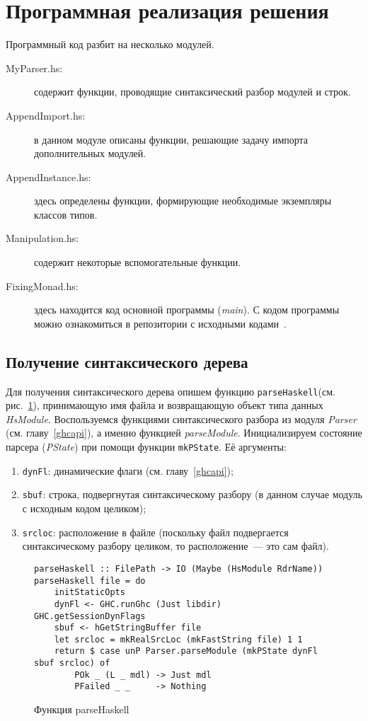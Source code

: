 \section{Программная реализация решения}
Программный код разбит на несколько модулей.
\begin{description}
    \item[MyParser.hs:] содержит функции, проводящие синтаксический разбор модулей и строк.
    \item[AppendImport.hs:] в данном модуле описаны функции, решающие задачу импорта дополнительных модулей.
    \item[AppendInstance.hs:] здесь определены функции, формирующие необходимые экземпляры классов типов.
    \item[Manipulation.hs:] содержит некоторые вспомогательные функции.
    \item[FixingMonad.hs:] здесь находится код основной программы (\textit{main}).
    С кодом программы можно ознакомиться в репозитории с исходными кодами~\autocite{github}.
\end{description}
\subsection{Получение синтаксического дерева}
Для получения синтаксического дерева опишем функцию \lstinline{parseHaskell}(см. рис.~\ref{parser}), принимающую имя файла и возвращающую объект типа данных \textit{HsModule}. Воспользуемся функциями синтаксического разбора из модуля \textit{Parser} (см. главу~\ref{ghcapi}), а именно функцией \textit{parseModule}. Инициализируем состояние парсера (\textit{PState}) при помощи функции \lstinline{mkPState}. Её аргументы:
\begin{enumerate}[1)]
\item \lstinline{dynFl}: динамические флаги (см. главу~\ref{ghcapi});
\item \lstinline{sbuf}: строка, подвергнутая синтаксическому разбору (в данном случае модуль с исходным кодом целиком);
\item \lstinline{srcloc}: расположение в файле (поскольку файл подвергается синтаксическому разбору целиком, то расположение~--- это сам файл).
\end{enumerate}

\begin{figure}[H]
\hrulefill
\begin{lstlisting}
parseHaskell :: FilePath -> IO (Maybe (HsModule RdrName))
parseHaskell file = do
    initStaticOpts
    dynFl <- GHC.runGhc (Just libdir) GHC.getSessionDynFlags
    sbuf <- hGetStringBuffer file
    let srcloc = mkRealSrcLoc (mkFastString file) 1 1
    return $ case unP Parser.parseModule (mkPState dynFl sbuf srcloc) of
        POk _ (L _ mdl) -> Just mdl
        PFailed _ _     -> Nothing
\end{lstlisting}
\hrulefill
\caption{Функция parseHaskell}\label{parser}
\end{figure}

